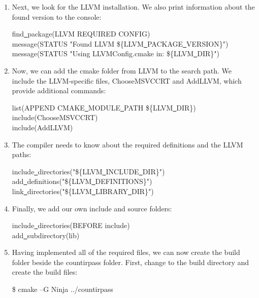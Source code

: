 \begin{enumerate}
\item Next, we look for the LLVM installation. We also print information about the found version to the console:
\begin{tcolorbox}[colback=white,colframe=black]
find\underline{~}package(LLVM REQUIRED CONFIG) \\
message(STATUS "Found LLVM \$\{LLVM\underline{~}PACKAGE\underline{~}VERSION\}") \\
message(STATUS "Using LLVMConfig.cmake in: \$\{LLVM\underline{~}DIR\}")
\end{tcolorbox}

\item Now, we can add the cmake folder from LLVM to the search path. We include the LLVM-specific files, ChooseMSVCCRT and AddLLVM, which provide additional commands:
\begin{tcolorbox}[colback=white,colframe=black]
list(APPEND CMAKE\underline{~}MODULE\underline{~}PATH \$\{LLVM\underline{~}DIR\}) \\
include(ChooseMSVCCRT) \\
include(AddLLVM)
\end{tcolorbox}

\item The compiler needs to know about the required definitions and the LLVM paths:
\begin{tcolorbox}[colback=white,colframe=black]
include\underline{~}directories("\$\{LLVM\underline{~}INCLUDE\underline{~}DIR\}") \\
add\underline{~}definitions("\$\{LLVM\underline{~}DEFINITIONS\}") \\
link\underline{~}directories("\$\{LLVM\underline{~}LIBRARY\underline{~}DIR\}")
\end{tcolorbox}

\item Finally, we add our own include and source folders:
\begin{tcolorbox}[colback=white,colframe=black]
include\underline{~}directories(BEFORE include) \\
add\underline{~}subdirectory(lib)
\end{tcolorbox}

\item Having implemented all of the required files, we can now create the build folder beside the countirpass folder. First, change to the build directory and create the build files:
\begin{tcolorbox}[colback=white,colframe=black]
\$ cmake –G Ninja ../countirpass
\end{tcolorbox}


\end{enumerate}
